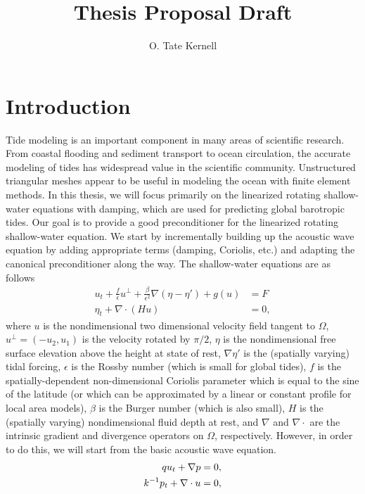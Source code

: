 \documentclass[11pt]{article}
\title{Thesis Proposal Draft}
\date{}
\author{O. Tate Kernell}
\begin{document}
\maketitle

\section{Introduction}
Tide modeling is an important component in many areas of scientific research. From coastal flooding and sediment transport to ocean circulation, the accurate modeling of tides has widespread value in the scientific community. Unstructured triangular meshes appear to be useful in modeling the ocean with finite element methods. In this thesis, we will focus primarily on the linearized rotating shallow-water equations with damping, which are used for predicting global barotropic tides. Our goal is to provide a good preconditioner for the linearized rotating shallow-water equation. We start by incrementally building up the acoustic wave equation by adding appropriate terms (damping, Coriolis, etc.) and adapting the canonical preconditioner along the way. The shallow-water equations are as follows
\begin{equation}
\begin{split}
u_t + \frac{f}{\epsilon}u^{\perp}+\frac{\beta}{\epsilon^2}\nabla(\eta - \eta')+g(u) &= F\\
\eta_t + \nabla \cdot (Hu) &= 0,
\end{split}
\end{equation}
where $u$ is the nondimensional two dimensional velocity field tangent to $\Omega$, $u^\perp = (-u_2,u_1)$ is the velocity rotated by $\pi/2$, $\eta$ is the nondimensional free surface elevation above the height at state of rest, $\nabla\eta'$ is the (spatially varying) tidal forcing, $\epsilon$ is the Rossby number (which is small for global tides), $f$ is the spatially-dependent non-dimensional Coriolis parameter which is equal to the sine of the latitude (or which can be approximated by a linear or constant profile for local area models), $\beta$ is the Burger number (which is also small), $H$ is the (spatially varying) nondimensional fluid depth at rest, and $\nabla$ and $\nabla \cdot$ are the intrinsic gradient and divergence operators on $\Omega$, respectively. However, in order to do this, we will start from the basic acoustic wave equation.
\begin{equation}{\label{acouswave}}
\begin{split}
qu_t + \nabla p &= 0, \\
k^{-1}p_t+ \nabla \cdot u &= 0,
\end{split}
\end{equation}
\end{document}
